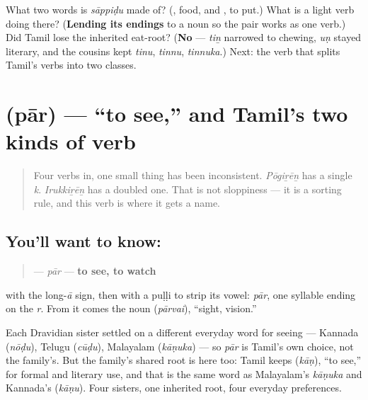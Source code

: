\begin{tcolorbox}[breakable,colback=teal!4,colframe=teal!35!black,title={Before you move on}]
What two words is \emph{sāppiḍu} made of? (\textbf{}, food, and \textbf{}, to put.) What is a light verb doing there? (\textbf{Lending its endings} to a noun so the pair works as one verb.) Did Tamil lose the inherited eat-root? (\textbf{No} — \emph{tiṉ} narrowed to chewing, \emph{uṇ} stayed literary, and the cousins kept \emph{tinu}, \emph{tinnu}, \emph{tinnuka}.) Next: the verb that splits Tamil's verbs into two classes.
\end{tcolorbox}
\section[\texorpdfstring{\ta{பார்} (pār)}{பார் (pār)}]{ (pār) — \textquotedblleft{}to see,\textquotedblright{} and Tamil's two kinds of verb}

\label{lesson:TA-C32-paar}



\begin{quote}
Four verbs in, one small thing has been inconsistent. \emph{Pōgiṟēṉ} has a single \emph{k}. \emph{Irukkiṟēṉ} has a doubled one. That is not sloppiness — it is a sorting rule, and this verb is where it gets a name.
\end{quote}

\subsection*{You'll want to know: }
\begin{quote}
\textbf{} — \emph{pār} — \textbf{to see, to watch}
\end{quote}

\textbf{} with the long-\emph{ā} sign, then \textbf{} with a puḷḷi to strip its vowel: \emph{pār}, one syllable ending on the \emph{r}. From it comes the noun \textbf{} (\emph{pārvai}), \textquotedblleft{}sight, vision.\textquotedblright{}

Each Dravidian sister settled on a different everyday word for seeing — Kannada \textbf{} (\emph{nōḍu}), Telugu \textbf{} (\emph{cūḍu}), Malayalam \textbf{} (\emph{kāṇuka}) — so \emph{pār} is Tamil's own choice, not the family's. But the family's shared root is here too: Tamil keeps \textbf{} (\emph{kāṇ}), \textquotedblleft{}to see,\textquotedblright{} for formal and literary use, and that is the same word as Malayalam's \emph{kāṇuka} and Kannada's \textbf{} (\emph{kāṇu}). Four sisters, one inherited root, four everyday preferences.

